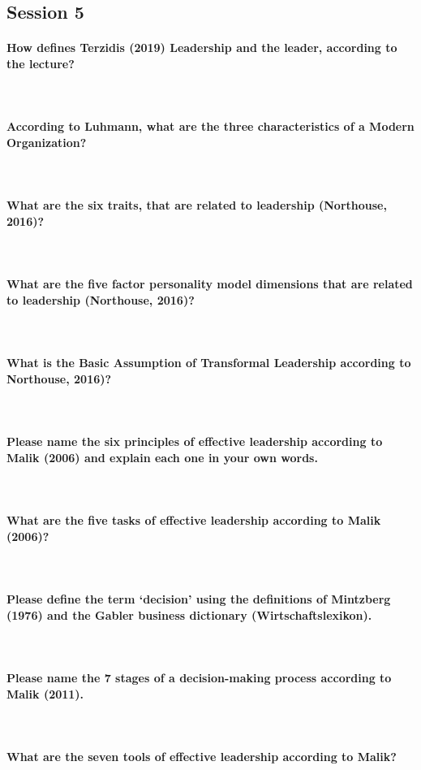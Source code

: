 \documentclass[10pt,a4paper,noendnumber=true]{scrartcl}
\newcommand{\properparagraph}[1]{\paragraph{\textcolor{Emerald}{#1}}\mbox{}\\}
\begin{document}

\newpage
\subsection{Session 5}
\properparagraph{How defines Terzidis (2019) Leadership and the leader, according to the lecture?}
\properparagraph{ According to Luhmann, what are the three characteristics of a Modern Organization?}
\properparagraph{What are the six traits, that are related to leadership (Northouse, 2016)?}
\properparagraph{What are the five factor personality model dimensions that are related to leadership (Northouse, 2016)?}
\properparagraph{What is the Basic Assumption of Transformal Leadership according to Northouse, 2016)?}
\properparagraph{Please name the six principles of effective leadership according to Malik (2006) and explain	each one in your own words.}
\properparagraph{What are the five tasks of effective leadership according to Malik (2006)?}
\properparagraph{Please define the term ‘decision’ using the definitions of Mintzberg (1976) and the Gabler business dictionary (Wirtschaftslexikon).}
\properparagraph{Please name the 7 stages of a decision-making process according to Malik (2011).}
\properparagraph{What are the seven tools of effective leadership according to Malik?}

\newpage
\end{document}
